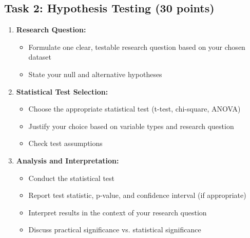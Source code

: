 \documentclass[11pt]{article}
\begin{document}
\subsection{Task 2: Hypothesis Testing (30 points)}
\begin{enumerate}
\item \textbf{Research Question:}
   \begin{itemize}
   \item Formulate one clear, testable research question based on your chosen dataset
   \item State your null and alternative hypotheses
   \end{itemize}

\item \textbf{Statistical Test Selection:}
   \begin{itemize}
   \item Choose the appropriate statistical test (t-test, chi-square, ANOVA)
   \item Justify your choice based on variable types and research question
   \item Check test assumptions
   \end{itemize}

\item \textbf{Analysis and Interpretation:}
   \begin{itemize}
   \item Conduct the statistical test
   \item Report test statistic, p-value, and confidence interval (if appropriate)
   \item Interpret results in the context of your research question
   \item Discuss practical significance vs. statistical significance
   \end{itemize}
\end{enumerate}
\end{document}
